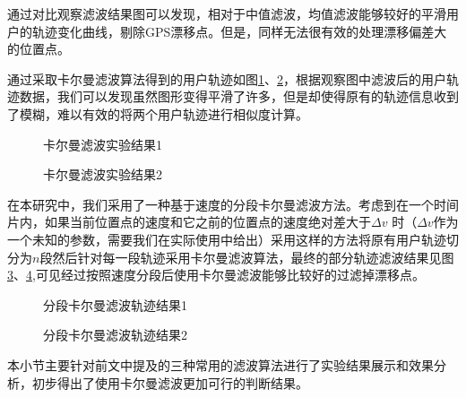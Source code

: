 \par 通过对比观察滤波结果图可以发现，相对于中值滤波，均值滤波能够较好的平滑用户的轨迹变化曲线，剔除GPS漂移点。但是，同样无法很有效的处理漂移偏差大的位置点。
\par 通过采取卡尔曼滤波算法得到的用户轨迹如图\ref{fig:3_4_1}、\ref{fig:3_4_2}，根据观察图中滤波后的用户轨迹数据，我们可以发现虽然图形变得平滑了许多，但是却使得原有的轨迹信息收到了模糊，难以有效的将两个用户轨迹进行相似度计算。
\begin{figure}[htb]
  \centering%
  \hspace{4em}%
  \caption{卡尔曼滤波实验结果1}
  \label{fig:3_4_1}
\end{figure}
\begin{figure}[htb]
  \centering%
  \hspace{4em}%
  \caption{卡尔曼滤波实验结果2}
  \label{fig:3_4_2}
\end{figure}
\par 在本研究中，我们采用了一种基于速度的分段卡尔曼滤波方法。考虑到在一个时间片内，如果当前位置点的速度和它之前的位置点的速度绝对差大于$\Delta v$ 时（$\Delta v$作为一个未知的参数，需要我们在实际使用中给出）采用这样的方法将原有用户轨迹切分为$n$段然后针对每一段轨迹采用卡尔曼滤波算法，最终的部分轨迹滤波结果见图\ref{fig:3_5_1}、\ref{fig:3_5_2},可见经过按照速度分段后使用卡尔曼滤波能够比较好的过滤掉漂移点。
\begin{figure}[htb]
  \centering%
  \hspace{4em}%
  \caption{分段卡尔曼滤波轨迹结果1}
  \label{fig:3_5_1}
\end{figure}
\begin{figure}[htb]
  \centering%
  \hspace{4em}%
  \caption{分段卡尔曼滤波轨迹结果2}
  \label{fig:3_5_2}
\end{figure}
\par 本小节主要针对前文中提及的三种常用的滤波算法进行了实验结果展示和效果分析，初步得出了使用卡尔曼滤波更加可行的判断结果。
